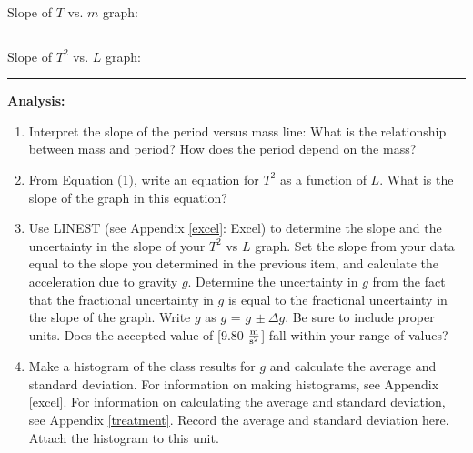 \vspace{10pt}

Slope of $T$ vs. $m$ graph: \rule{1.5in}{0.2pt}

\vspace{10pt}

Slope of $T^2$ vs. $L$ graph:  \rule{1.5in}{0.2pt}

\vspace{10pt}

{\noindent \bf Analysis:}

\begin{enumerate}[labparts]
\item Interpret the slope of the period versus mass line: What is the relationship between mass and period? How does the period depend on the mass? 
\vspace{20mm}

\item From Equation (1), write an equation for $T^2$ as a function of $L$. What is the slope of the graph in this equation?
\vspace{30mm}


\item Use LINEST (see Appendix \ref{excel}: Excel) to determine the slope and the uncertainty in the slope of your $T^2$ vs $L$ graph. Set the slope from your data equal to the slope you determined in the previous item, and calculate the acceleration due to gravity $g$. Determine the uncertainty in $g$ from the fact that the fractional uncertainty in $g$ is equal to the fractional uncertainty in the slope of the graph. Write $g$ as $g$ = $g$ \( \pm \ \Delta  g\). Be sure to include proper units. Does the accepted value of [9.80 $\frac{\rm m}{\rm s^2}$] fall within your range of values?
\vspace{30mm}

\item Make a histogram of the class results for $g$ and calculate the average and standard deviation. For information on making histograms, see Appendix \ref{excel}. For information on calculating the average and standard deviation, see Appendix \ref{treatment}. Record the average and standard deviation here. Attach the histogram to this unit.
\end{enumerate}
